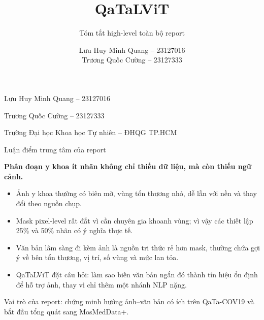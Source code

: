 \documentclass[aspectratio=169,11pt]{beamer}
\title[QaTaLViT]{QaTaLViT}
\subtitle{Tóm tắt high-level toàn bộ report}
\author[23127016 -- 23127333]{Lưu Huy Minh Quang -- 23127016\\Trương Quốc Cường -- 23127333}
\institute[HCMUS]{Trường Đại học Khoa học Tự nhiên -- ĐHQG TP.HCM}
\date{}
\newcommand{\reportclaim}[1]{%
  \vspace{0.10cm}
  {\large\bfseries\color{accentblue}#1\par}
  \vspace{0.08cm}
}
\newcommand{\smallnote}[1]{%
  \par
  \vspace{0.12cm}
  {\footnotesize\color{ink}#1\par}
}
\begin{document}
\begin{frame}[plain]
  \centering
  \vspace{0.85cm}
  \vspace{0.35cm}
  {\large Lưu Huy Minh Quang -- 23127016\par}
  \vspace{0.12cm}
  {\large Trương Quốc Cường -- 23127333\par}
  \vspace{0.18cm}
  {\normalsize Trường Đại học Khoa học Tự nhiên -- ĐHQG TP.HCM\par}
\end{frame}

\begin{frame}{Luận điểm trung tâm của report}
  \reportclaim{Phân đoạn y khoa ít nhãn không chỉ thiếu dữ liệu, mà còn thiếu ngữ cảnh.}
  \begin{itemize}
    \item Ảnh y khoa thường có biên mờ, vùng tổn thương nhỏ, dễ lẫn với nền và thay đổi theo nguồn chụp.
    \item Mask pixel-level rất đắt vì cần chuyên gia khoanh vùng; vì vậy các thiết lập 25\% và 50\% nhãn có ý nghĩa thực tế.
    \item Văn bản lâm sàng đi kèm ảnh là nguồn tri thức rẻ hơn mask, thường chứa gợi ý về bên tổn thương, vị trí, số vùng và mức lan tỏa.
    \item QaTaLViT đặt câu hỏi: làm sao biến văn bản ngắn đó thành tín hiệu ổn định để hỗ trợ ảnh, thay vì chỉ thêm một nhánh NLP nặng.
  \end{itemize}
  \smallnote{Vai trò của report: chứng minh hướng ảnh--văn bản có ích trên QaTa-COV19 và bắt đầu tổng quát sang MosMedData+.}
\end{frame}
\end{document}
